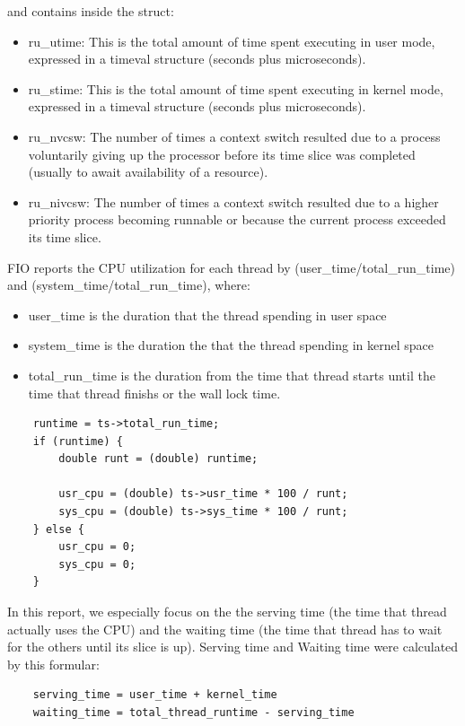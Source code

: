 \documentclass{acmsig}
\begin{document}
and contains inside the struct:

\begin{itemize}
  \item ru\_utime: This is the total amount of time spent executing in user mode, expressed in a timeval structure (seconds plus microseconds).
  \item ru\_stime: This is the total amount of time spent executing in kernel mode, expressed in a timeval structure (seconds plus microseconds).
  \item ru\_nvcsw: The number of times a context switch resulted due to a process voluntarily giving up the processor before its time slice was completed (usually to await availability of a resource).
  \item ru\_nivcsw: The number of times a context switch resulted due to a higher priority process becoming runnable or because the current process exceeded its time slice.
\end{itemize}

FIO reports the CPU utilization for each thread by (user\_time/total\_run\_time) and (system\_time/total\_run\_time), where:

\begin{itemize}
  \item user\_time is the duration that the thread spending in user space
  \item system\_time is the duration the that the thread spending in kernel space
  \item total\_run\_time is the duration from the time that thread starts until the time that thread finishs or the wall lock time.
\end{itemize}

\begin{lstlisting}
    runtime = ts->total_run_time;
    if (runtime) {
        double runt = (double) runtime;

        usr_cpu = (double) ts->usr_time * 100 / runt;
        sys_cpu = (double) ts->sys_time * 100 / runt;
    } else {
        usr_cpu = 0;
        sys_cpu = 0;
    }
\end{lstlisting}
In this report, we especially focus on the the serving time (the time that thread actually uses the CPU) and the waiting time (the time that thread has to wait for the others until its slice is up). Serving time and Waiting time were calculated by this formular:
\begin{lstlisting}
    serving_time = user_time + kernel_time
    waiting_time = total_thread_runtime - serving_time
\end{lstlisting}
\end{document}
